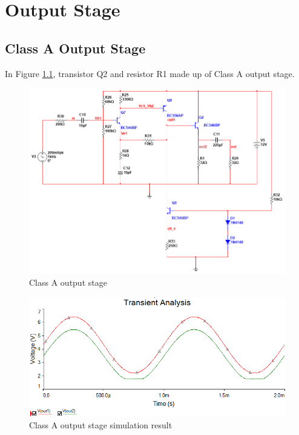 \chapter{Output Stage}

\section{Class A Output Stage}

In Figure \ref{fig:ClassAoutputstage}, transistor Q2 and resistor R1 made up of Class A output stage.

\begin{figure}[htbp]
\centering
\includegraphics[scale=0.6]{"../Photo/Chap4/Class A output stage"}
\caption{Class A output stage}
\label{fig:ClassAoutputstage}
\end{figure}


\begin{figure}[htbp]
\centering
\includegraphics[scale=0.7]{"../Photo/Chap4/Class A simulation result"}
\caption{Class A output stage simulation result}
\label{fig:ClassAsimulationresult}
\end{figure}

